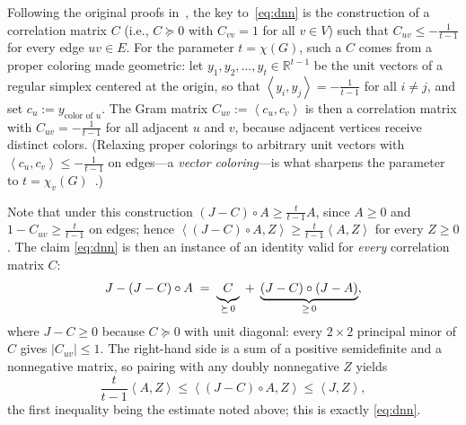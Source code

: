 \documentclass[11pt,letterpaper,reqno]{amsart}
\theoremstyle{definition}
\newcommand{\R}{\mathbb R}
\newcommand{\ip}[2]{\left\langle #1,#2\right\rangle}
\newcommand{\norm}[1]{\left\lVert #1\right\rVert}
\newcommand{\ppar}[1]{\par\addvspace{\medskipamount}\noindent{\bfseries #1.}\enspace\ignorespaces}
\begin{document}

\ppar{The idea behind \eqref{eq:dnn}}
Following the original proofs in~\cite{AL,CS}, the key to~\eqref{eq:dnn}
is the construction of a correlation matrix $C$ (i.e., $C\succeq0$ with
$C_{vv}=1$ for all $v\in V$) such that $C_{uv}\le-\frac1{t-1}$ for
every edge $uv\in E$.  For the parameter $t=\chi(G)$, such a $C$ comes
from a proper coloring made geometric: let
$y_1,y_2,\ldots,y_t\in\R^{t-1}$ be the unit vectors of a regular
simplex centered at the origin, so that
$\ip{y_i}{y_j}=-\frac1{t-1}$ for all $i\ne j$, and set
$c_u:=y_{\text{color of }u}$.  The Gram matrix
$C_{uv}:=\ip{c_u}{c_v}$ is then a correlation matrix with
$C_{uv}=-\frac1{t-1}$ for all adjacent $u$ and $v$, because adjacent
vertices receive distinct colors.  (Relaxing proper colorings to
arbitrary unit vectors with $\ip{c_u}{c_v}\le-\frac1{t-1}$ on edges---a \emph{vector coloring}---is what sharpens the parameter to
$t=\chi_v(G)$~\cite{CS}.)


Note that under this construction $(J-C)\circ A\ge\tfrac t{t-1}A$,
since $A\ge0$ and $1-C_{uv}\ge\tfrac t{t-1}$ on edges; hence
$\ip{(J-C)\circ A}{Z}\ge\tfrac t{t-1}\ip AZ$ for every $Z\ge0$.  The
claim \eqref{eq:dnn} is then an instance of an identity valid for
\emph{every} correlation matrix $C$:
\begin{equation}\label{eq:conic}
    J-(J-C)\circ A
    \;=\;
    \underbrace{\vphantom{(J-C)}C}_{\succeq\,0}
    \;+\;
    \underbrace{(J-C)\circ(J-A)}_{\ge\,0},
\end{equation}
where $J-C\ge0$ because $C\succeq0$ with unit diagonal: every
$2\times2$ principal minor of $C$ gives $|C_{uv}|\le1$.  The
right-hand side is a sum of a positive semidefinite and a nonnegative
matrix, so pairing with any doubly nonnegative $Z$ yields
\[
    \frac t{t-1}\ip AZ\le\ip{(J-C)\circ A}{Z}\le\ip JZ,
\]
the first inequality being the estimate noted above; this is exactly
\eqref{eq:dnn}.
\end{document}
